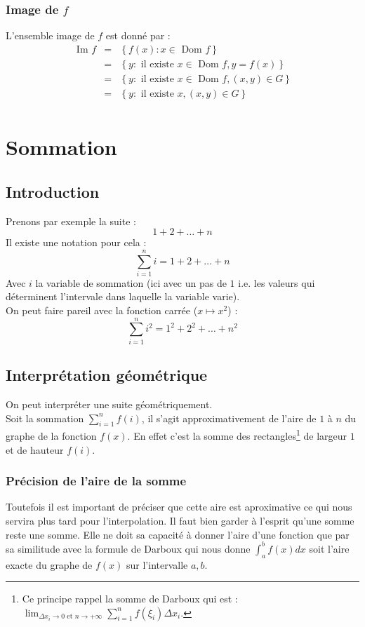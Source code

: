 \documentclass[a4paper,10pt]{report}
\newcommand{\dom}{\mbox{ Dom }}
\newcommand{\im}{\mbox{ Im }}
\begin{document}
\subsection{Image de $f$}
L'ensemble image de $f$ est donné par :
\begin{eqnarray*}
\im f & = &\left\lbrace f(x) : x \in \dom f\right\rbrace\\
& = &\left\lbrace y : \mbox{ il existe } x \in \dom f, y =f(x)\right\rbrace\\
& = &\left\lbrace y : \mbox{ il existe } x \in \dom f, (x,y) \in G \right\rbrace\\
& = &\left\lbrace y : \mbox{ il existe } x, (x,y) \in G \right\rbrace\\
\end{eqnarray*}

\newpage \chapter{Sommation}

\section{Introduction}
Prenons par exemple la suite :
$$1+2+\ldots+n$$
Il existe une notation pour cela :
\begin{displaymath}
\sum_{i=1}^{n} i = 1+2+\ldots+n
\end{displaymath}
Avec $i$ la variable de sommation (ici avec un pas de $1$ i.e. les valeurs qui déterminent l'intervale dans laquelle la variable varie).\\
On peut faire pareil avec la fonction carrée ($x \mapsto x^2$) :
$$\sum_{i=1}^{n} i^2 = 1^2 + 2^2 + \ldots + n^2$$
\section{Interprétation géométrique}
On peut interpréter une suite géométriquement.\\
Soit la sommation $\sum_{i=1}^{n} f(i)$, il s'agit approximativement de l'aire de $1$ à $n$ du graphe de la fonction $f(x)$. En effet c'est la somme des rectangles\footnote{Ce principe rappel la somme de Darboux qui est : $\displaystyle{\lim_{\Delta x_i \rightarrow 0 \mbox{ et } n \rightarrow +\infty} \sum_{i=1}^{n} f(\xi_i)\Delta x_i}$.} de largeur $1$ et de hauteur $f(i)$. 
\subsection{Précision de l'aire de la somme}
Toutefois il est important de préciser que cette aire est aproximative ce qui nous servira plus tard pour l'interpolation. Il faut bien garder à l'esprit qu'une somme reste une somme. Elle ne doit sa capacité à donner l'aire d'une fonction que par sa similitude avec la formule de Darboux qui nous donne $\int_{a}^{b}f(x) dx$ soit l'aire exacte du graphe de $f(x)$ sur l'intervalle $a,b$.
\end{document}
